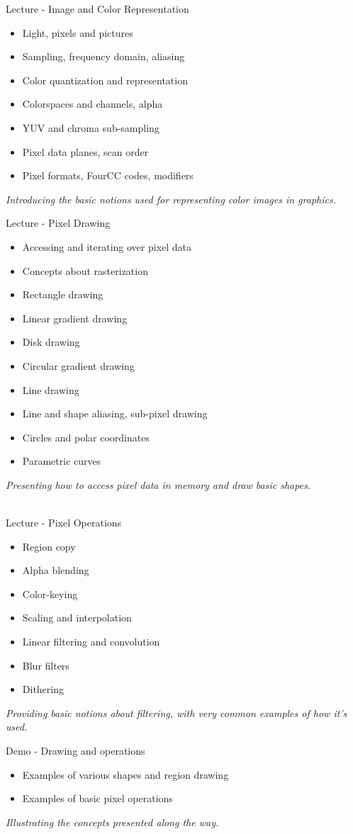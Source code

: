 \documentclass[a4paper,12pt,obeyspaces,spaces,hyphens]{article}
\begin{document}
\feagendatwocolumn
{Lecture - Image and Color Representation}
{
  \begin{itemize}
  \item Light, pixels and pictures
  \item Sampling, frequency domain, aliasing
  \item Color quantization and representation
  \item Colorspaces and channels, alpha
  \item YUV and chroma sub-sampling
  \item Pixel data planes, scan order
  \item Pixel formats, FourCC codes, modifiers
  \end{itemize}
  \vspace{0.5em}
  {\em Introducing the basic notions used for representing color images in graphics.}
}
{Lecture - Pixel Drawing}
{
  \begin{itemize}
  \item Accessing and iterating over pixel data
  \item Concepts about rasterization
  \item Rectangle drawing
  \item Linear gradient drawing
  \item Disk drawing
  \item Circular gradient drawing
  \item Line drawing
  \item Line and shape aliasing, sub-pixel drawing
  \item Circles and polar coordinates
  \item Parametric curves
  \end{itemize}
  \vspace{0.5em}
  {\em Presenting how to access pixel data in memory and draw basic shapes.}
}
\\
\feagendatwocolumn
{Lecture - Pixel Operations}
{
  \begin{itemize}
  \item Region copy
  \item Alpha blending
  \item Color-keying
  \item Scaling and interpolation
  \item Linear filtering and convolution
  \item Blur filters
  \item Dithering
  \end{itemize}
  \vspace{0.5em}
  {\em Providing basic notions about filtering, with very common examples of how it's used.}
}
{Demo - Drawing and operations}
{
  \begin{itemize}
  \item Examples of various shapes and region drawing
  \item Examples of basic pixel operations
  \end{itemize}
  \vspace{0.5em}
  {\em Illustrating the concepts presented along the way.}
}
\end{document}

